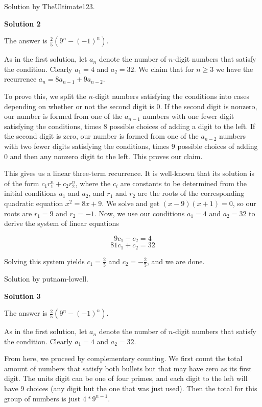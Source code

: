\begin{enumerate}
 Solution by TheUltimate123.

 



\textbf{Solution 2}

The answer is $\boxed{\frac{2}{5}\left(9^n-(-1)^{n}\right)}$.

 As in the first solution, let $a_n$ denote the number of $n$-digit numbers that satisfy the condition.  Clearly $a_1 = 4$ and $a_2 = 32$.  We claim that for $n \geq 3$ we have the recurrence $a_n = 8a_{n-1} + 9a_{n-2}$.

 To prove this, we split the $n$-digit numbers satisfying the conditions into cases depending on whether or not the second digit is $0$.   If the second digit is nonzero, our number is formed from one of the $a_{n-1}$ numbers with one fewer digit satisfying the conditions, times $8$ possible choices of adding a digit to the left.  If the second digit is zero, our number is formed from one of the $a_{n-2}$ numbers with two fewer digits satisfying the conditions, times $9$ possible choices of adding $0$ and then any nonzero digit to the left.  This proves our claim.

 This gives us a linear three-term recurrence.  It is well-known that its solution is of the form $c_1r_1^n + c_2r_2^n$, where the $c_i$ are constants to be determined from the initial conditions $a_1$ and $a_2$, and $r_1$ and $r_2$ are the roots of the corresponding quadratic equation $x^2 = 8x + 9$.  We solve and get $(x-9)(x+1) = 0$, so our roots are $r_1 = 9$ and $r_2 = -1$.  Now, we use our conditions $a_1 = 4$ and $a_2 = 32$ to derive the system of linear equations 

 
 \[9c_1 - c_2 = 4\]
 \[81c_1 + c_2 = 32\]

 Solving this system yields $c_1 = \frac{2}{5}$ and $c_2 = -\frac{2}{5}$, and we are done.

 Solution by putnam-lowell.

 



\textbf{Solution 3}

The answer is $\boxed{\frac{2}{5}\left(9^n-(-1)^{n}\right)}$.

 As in the first solution, let $a_n$ denote the number of $n$-digit numbers that satisfy the condition. Clearly $a_1 = 4$ and $a_2 = 32$.

 From here, we proceed by complementary counting. We first count the total amount of numbers that satisfy both bullets but that may have zero as its first digit. The units digit can be one of four primes, and each digit to the left will have 9 choices (any digit but the one that was just used). Then the total for this group of numbers is just $4*9^{n-1}$.


\end{enumerate}
